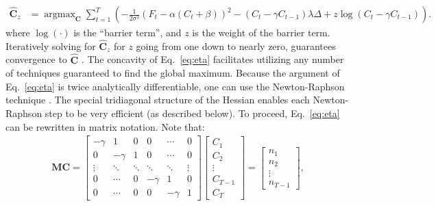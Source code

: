 \documentclass{article}
\providecommand{\ve}[1]{\boldsymbol{#1}}
\DeclareMathOperator*{\argmax}{argmax}
\newcommand{\bb}{\ve{b}}
\newcommand{\bn}{\ve{n}}
\newcommand{\bC}{\ve{C}}
\newcommand{\hbC}{\widehat{\ve{C}}}
\newcommand{\Del}{\Delta}
\newcommand{\sig}{\sigma}
\newcommand{\lam}{\lambda}
\newcommand{\gam}{\gamma}
\newcommand{\zzz}{z}
\begin{document}
\begin{align} \label{eq:eta}
\hbC_{\zzz} &= \argmax_{\bC}  \sum_{t=1}^T \left( -\frac{1}{2 \sig^2}(F_t - \alpha(C_t + \beta))^2  -  (C_t-\gam C_{t-1})  \lam \Del + \zzz \log (C_t-\gam C_{t-1}) \right).
\end{align}
\noindent where $\log (\cdot)$ is the ``barrier term'', and $z$ is the weight of the barrier term.  Iteratively solving for $\hbC_{\zzz}$ for $z$ going from one down to nearly zero, guarantees convergence to $\hbC$ \cite{CONV04}. %
The concavity of Eq.~\eqref{eq:eta} facilitates utilizing any number of techniques guaranteed to find the global maximum.  Because the argument of Eq.~\eqref{eq:eta} is twice analytically differentiable, one can use the Newton-Raphson technique \cite{Press92}. The special tridiagonal structure of the Hessian enables each Newton-Raphson step to be very efficient (as described below).  To proceed, Eq.~\eqref{eq:eta} can be rewritten in matrix notation.  Note that:
\begin{align} \label{eq:M}
\ve{M} \bC = %
\begin{bmatrix}
-\gam & 1 & 0 & 0 & \cdots & 0 \\
0 & -\gam & 1 & 0 & \cdots  & 0 \\
\vdots & \ddots & \ddots & \ddots & \ddots & \vdots  \\
0 & \cdots & 0  & -\gam & 1 & 0 \\
0 & \cdots & 0 & 0 & -\gam & 1
\end{bmatrix}
\begin{bmatrix}
C_1 \\ C_2 \\  \vdots \\ C_{T-1} \\ C_T
\end{bmatrix}
= 
\begin{bmatrix}
n_1 \\ n_2 \\ \vdots  \\ n_{T-1}
\end{bmatrix}
, %
\end{align}
\end{document}
